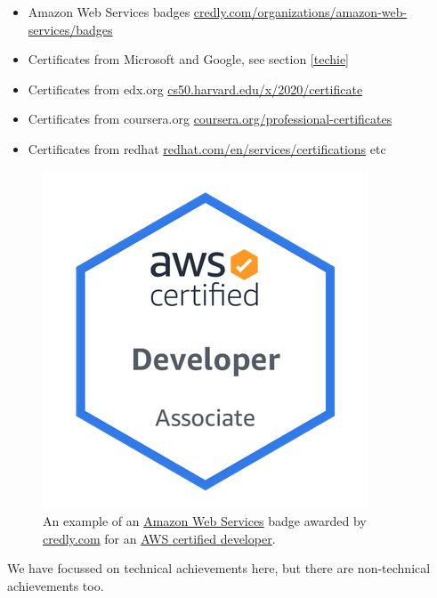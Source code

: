 \documentclass[
]{book}
\providecommand{\tightlist}{%
  \setlength{\itemsep}{0pt}\setlength{\parskip}{0pt}}
\begin{document}
\begin{itemize}
\tightlist
\item
  Amazon Web Services badges \href{https://www.credly.com/organizations/amazon-web-services/badges}{credly.com/organizations/amazon-web-services/badges}
\item
  Certificates from Microsoft and Google, see section \ref{techie}
\item
  Certificates from edx.org \href{https://cs50.harvard.edu/x/2020/certificate/}{cs50.harvard.edu/x/2020/certificate}
\item
  Certificates from coursera.org \href{https://www.coursera.org/professional-certificates}{coursera.org/professional-certificates}
\item
  Certificates from redhat \href{https://www.redhat.com/en/services/certifications}{redhat.com/en/services/certifications} etc
\end{itemize}

\begin{figure}

{\centering \includegraphics[width=0.66\linewidth]{images/amazon-badge} 

}

\caption{An example of an \href{https://en.wikipedia.org/wiki/Amazon_Web_Services}{Amazon Web Services} badge awarded by \href{https://info.credly.com/}{credly.com} for an \href{https://www.credly.com/org/amazon-web-services/badge/aws-certified-developer-associate}{AWS certified developer}.}\label{fig:amazon-badge-fig}
\end{figure}



We have focussed on technical achievements here, but there are non-technical achievements too.
\end{document}
